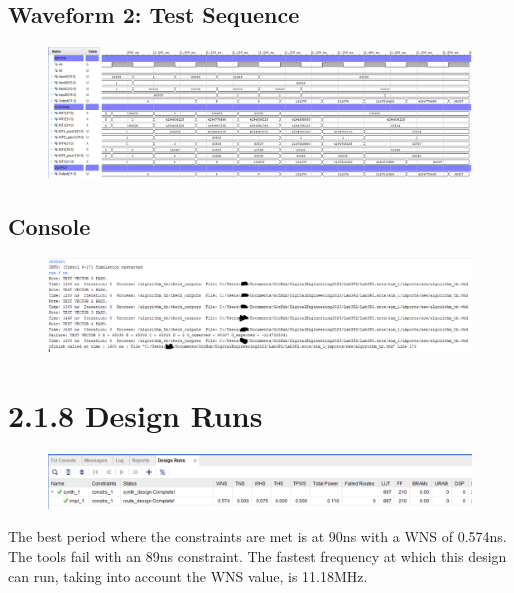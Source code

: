 \documentclass[11pt]{report}
\begin{document}
\subsection*{Waveform 2: Test Sequence}
\begin{figure}[H]
    \includegraphics[width=\columnwidth]{Reports/Lab3/Assets/2.1.7_waveform-test-sequence.png}
\end{figure}

\subsection*{Console}
\begin{figure}[H]
    \includegraphics[width=\columnwidth]{Reports/Lab3/Assets/2.1.7_console.png}
\end{figure}

\section*{2.1.8 Design Runs}
\begin{figure}[H]
    \includegraphics[width=\columnwidth]{Reports/Lab3/Assets/2.1.8_design-runs.png}
\end{figure}
The best period where the constraints are met is at 90ns with a WNS of 0.574ns. The tools fail with an 89ns constraint. The fastest frequency at which this design can run, taking into account the WNS value, is 11.18MHz.
\end{document}
